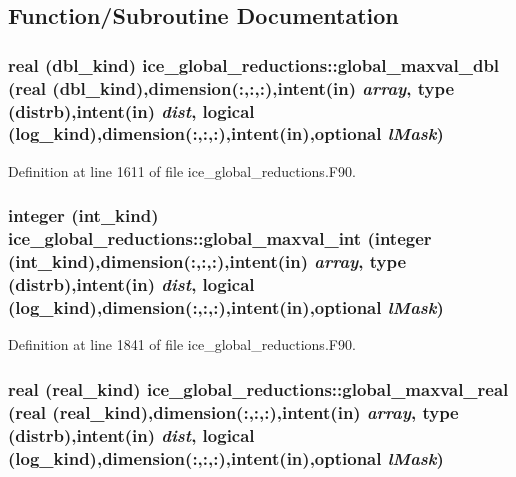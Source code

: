 \subsection{Function/Subroutine Documentation}
\hypertarget{namespaceice__global__reductions_afcc42be44d8b5383d354d22c849ca69f}{
\subsubsection[{global\_\-maxval\_\-dbl}]{\setlength{\rightskip}{0pt plus 5cm}real (dbl\_\-kind) ice\_\-global\_\-reductions::global\_\-maxval\_\-dbl (real (dbl\_\-kind),dimension(:,:,:),intent(in) {\em array}, \/  type (distrb),intent(in) {\em dist}, \/  logical (log\_\-kind),dimension(:,:,:),intent(in),optional {\em lMask})}}
\label{namespaceice__global__reductions_afcc42be44d8b5383d354d22c849ca69f}


Definition at line 1611 of file ice\_\-global\_\-reductions.F90.\hypertarget{namespaceice__global__reductions_a09f454330678940b2277d70e4535290e}{
\subsubsection[{global\_\-maxval\_\-int}]{\setlength{\rightskip}{0pt plus 5cm}integer (int\_\-kind) ice\_\-global\_\-reductions::global\_\-maxval\_\-int (integer (int\_\-kind),dimension(:,:,:),intent(in) {\em array}, \/  type (distrb),intent(in) {\em dist}, \/  logical (log\_\-kind),dimension(:,:,:),intent(in),optional {\em lMask})}}
\label{namespaceice__global__reductions_a09f454330678940b2277d70e4535290e}


Definition at line 1841 of file ice\_\-global\_\-reductions.F90.\hypertarget{namespaceice__global__reductions_a85255323eef62fc17da07a4a61d89744}{
\subsubsection[{global\_\-maxval\_\-real}]{\setlength{\rightskip}{0pt plus 5cm}real (real\_\-kind) ice\_\-global\_\-reductions::global\_\-maxval\_\-real (real (real\_\-kind),dimension(:,:,:),intent(in) {\em array}, \/  type (distrb),intent(in) {\em dist}, \/  logical (log\_\-kind),dimension(:,:,:),intent(in),optional {\em lMask})}}
\label{namespaceice__global__reductions_a85255323eef62fc17da07a4a61d89744}


